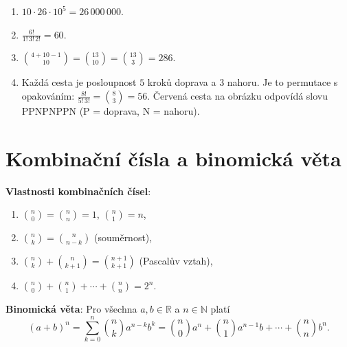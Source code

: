 \begin{solution}
  \begin{enumerate}[label=(\alph*)]
    \item $10\cdot 26\cdot 10^5 = 26\,000\,000$.
    \item $\frac{6!}{1!\,3!\,2!} = 60$.
    \item $\binom{4 + 10 - 1}{10} = \binom{13}{10} = \binom{13}{3} = 286$.
    \item Každá cesta je posloupnost $5$ kroků doprava a $3$ nahoru. Je to permutace s opakováním: $\frac{8!}{5!\,3!} = \binom{8}{3} = 56$. Červená cesta na obrázku odpovídá slovu PPNPNPPN (P = doprava, N = nahoru).
    \begin{center}
    \end{center}
  \end{enumerate}
\end{solution}

\section{Kombinační čísla a binomická věta}\label{sec:binomicka-veta}

\begin{definitionbox}
  \textbf{Vlastnosti kombinačních čísel}:
  \begin{enumerate}
    \item $\binom{n}{0} = \binom{n}{n} = 1$, $\binom{n}{1} = n$,
    \item $\binom{n}{k} = \binom{n}{n - k}$ \quad(souměrnost),
    \item $\binom{n}{k} + \binom{n}{k + 1} = \binom{n + 1}{k + 1}$ \quad(Pascalův vztah),
    \item $\binom{n}{0} + \binom{n}{1} + \cdots + \binom{n}{n} = 2^n$.
  \end{enumerate}

  \textbf{Binomická věta}: Pro všechna $a, b\in\mathbb{R}$ a $n\in\mathbb{N}$ platí
  \begin{equation*}
    {(a + b)}^n = \sum_{k=0}^{n}\binom{n}{k}a^{n-k}b^k = \binom{n}{0}a^n + \binom{n}{1}a^{n-1}b + \cdots + \binom{n}{n}b^n.
  \end{equation*}
\end{definitionbox}

